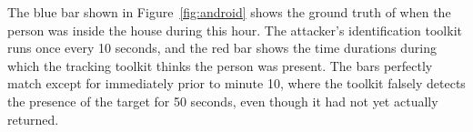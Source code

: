 The blue bar shown in Figure~\ref{fig:android} shows the ground truth of when
the person was inside the house during this hour. The attacker's identification
toolkit runs once every 10 seconds, and the red bar shows the time durations
during which the tracking toolkit thinks the person was present. The bars
perfectly match except for immediately prior to minute 10, where the toolkit
falsely detects the presence of the target for 50 seconds, even though it had
not yet actually returned.

\fi
